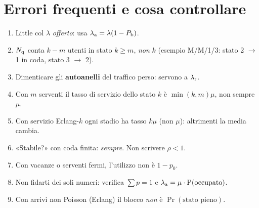 \section{Errori frequenti e cosa controllare}
\begin{attenzione}
\begin{enumerate}[leftmargin=*]
\item Little col $\lambda$ \emph{offerto}: usa $\lambda_{\mathrm{a}}=\lambda(1-P_{\mathrm{b}})$.
\item $N_{\mathrm{q}}$ conta $k-m$ utenti in stato $k\ge m$, \emph{non} $k$ (esempio M/M/1/3: stato 2 $\to$ 1 in coda, stato 3 $\to$ 2).
\item Dimenticare gli \textbf{autoanelli} del traffico perso: servono a $\lambda_{\mathrm{r}}$.
\item Con $m$ serventi il tasso di servizio dello stato $k$ è $\min(k,m)\mu$, non sempre $\mu$.
\item Con servizio Erlang-$k$ ogni stadio ha tasso $k\mu$ (non $\mu$): altrimenti la media cambia.
\item «Stabile?» con coda finita: \emph{sempre}. Non scrivere $\rho<1$.
\item Con vacanze o serventi fermi, l'utilizzo non è $1-p_0$.
\item Non fidarti dei soli numeri: verifica $\sum p=1$ e $\lambda_{\mathrm{a}}=\mu\cdot\mathrm{P}(\text{occupato})$.
\item Con arrivi non Poisson (Erlang) il blocco \emph{non} è $\Pr(\text{stato pieno})$.
\end{enumerate}
\end{attenzione}

